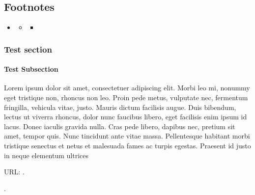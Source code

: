 \documentclass[a4paper,10pt,openany,oneside,english]{sphinxmanual}
\begin{document}
\subsection{Footnotes}
\label{\detokenize{guides/operational/cso/footnotes:footnotes}}\label{\detokenize{guides/operational/cso/footnotes::doc}}
\begin{sphinxShadowBox}
\begin{itemize}
\item {} 
\sphinxAtStartPar
{}\label{\detokenize{guides/operational/cso/footnotes:id3}}{\hyperref[\detokenize{guides/operational/cso/footnotes:footnotes}]{}}
\begin{itemize}
\item {} 
\sphinxAtStartPar
{}\label{\detokenize{guides/operational/cso/footnotes:id4}}{\hyperref[\detokenize{guides/operational/cso/footnotes:test-section}]{}}
\begin{itemize}
\item {} 
\sphinxAtStartPar
{}\label{\detokenize{guides/operational/cso/footnotes:id5}}{\hyperref[\detokenize{guides/operational/cso/footnotes:test-subsection}]{}}

\end{itemize}

\end{itemize}

\end{itemize}
\end{sphinxShadowBox}


\subsubsection{Test section}
\label{\detokenize{guides/operational/cso/footnotes:test-section}}

\paragraph{Test Subsection}
\label{\detokenize{guides/operational/cso/footnotes:test-subsection}}
\sphinxAtStartPar
Lorem ipsum dolor sit amet, consectetuer adipiscing elit. Morbi leo mi, nonummy eget tristique non, rhoncus non leo.
Proin pede metus, vulputate nec, fermentum fringilla, vehicula vitae, justo. Mauris dictum facilisis augue. Duis bibendum,
lectus ut viverra rhoncus, dolor nunc faucibus libero, eget facilisis enim ipsum id lacus. Donec iaculis gravida nulla.
Cras pede libero, dapibus nec, pretium sit amet, tempor quis. Nunc tincidunt ante vitae massa. Pellentesque habitant
morbi tristique senectus et netus et malesuada fames ac turpis egestas.
Praesent id justo in neque elementum ultrices %
\begin{footnote}[1]\sphinxAtStartFootnote
URL: .
%
\end{footnote}.
\end{document}
